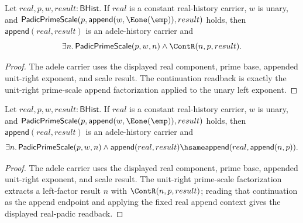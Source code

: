 \begin{theorem}
\label{thm:adele-history-carrier-unit-right-scale-cont-readback}
Let $real,p,w,result:\mathsf{BHist}$. If $real$ is a constant real-history
carrier, $w$ is unary, and
$\mathsf{PadicPrimeScale}(p,\mathsf{append}(w,\Eone(\emp)),result)$ holds,
then $\mathsf{append}(real,result)$ is an adele-history carrier and
$$
\exists n.\,\mathsf{PadicPrimeScale}(p,w,n)\land\ContR(n,p,result).
$$
\end{theorem}
\begin{proof}
The adele carrier uses the displayed real component, prime base, appended
unit-right exponent, and scale result. The continuation readback is exactly the
unit-right prime-scale append factorization applied to the unary left exponent.
\end{proof}

\begin{theorem}
\label{thm:adele-history-carrier-unit-right-scale-append-readback}
Let $real,p,w,result:\mathsf{BHist}$. If $real$ is a constant real-history
carrier, $w$ is unary, and
$\mathsf{PadicPrimeScale}(p,\mathsf{append}(w,\Eone(\emp)),result)$ holds,
then $\mathsf{append}(real,result)$ is an adele-history carrier and
$$
\exists n.\,
\mathsf{PadicPrimeScale}(p,w,n)\land
\mathsf{append}(real,result)\hsame
\mathsf{append}(real,\mathsf{append}(n,p)).
$$
\end{theorem}
\begin{proof}
The adele carrier uses the displayed real component, prime base, appended
unit-right exponent, and scale result. The unit-right prime-scale factorization
extracts a left-factor result $n$ with $\ContR(n,p,result)$; reading that
continuation as the append endpoint and applying the fixed real append context
gives the displayed real-padic readback.
\end{proof}


